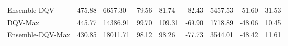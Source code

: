 \documentclass{article}
\begin{document}
\begin{table}
\begin{tabular}{lclclclcl}
\hhline{>{\arrayrulecolor{black}}->{\arrayrulecolor[rgb]{1,0.988,0.62}}-~~~~~~~}
Ensemble-DQV                                & \multicolumn{1}{l}{{\cellcolor[rgb]{1,0.988,0.62}}475.88} & 6657.30                 & \multicolumn{1}{l}{79.56}                                 & 81.74                   & \multicolumn{1}{l}{-82.43} & 5457.53                 & \multicolumn{1}{l}{-51.60} & 31.53                    \\
\arrayrulecolor{black}\cline{1-1}
DQV-Max                                     & 445.77                                                    & 14386.91                & 99.70                                                     & 109.31                  & -69.90                     & 1718.89                 & -48.06                     & 10.45                    \\
\cline{1-1}
Ensemble-DQV-Max                            & \multicolumn{1}{l}{430.85}                                & 18011.71                & \multicolumn{1}{l}{98.12}                                 & 98.26                   & \multicolumn{1}{l}{-77.73} & 3544.01                 & \multicolumn{1}{l}{-48.42} & 11.61                    \\
\bottomrule
\end{tabular}
\end{table}
\end{document}
